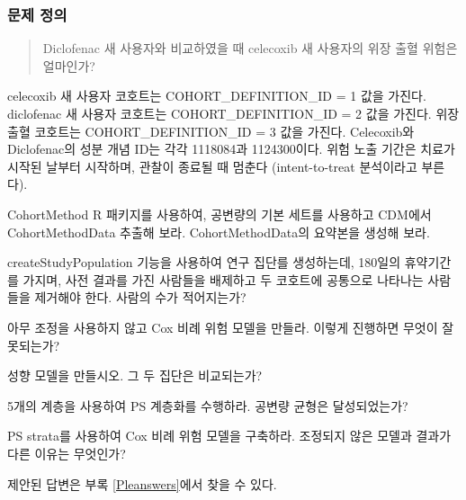\documentclass[11pt]{book}
\theoremstyle{definition}
\theoremstyle{definition}
\theoremstyle{definition}
\theoremstyle{remark}
\let\BeginKnitrBlock\begin \let\EndKnitrBlock\end
\begin{document}
\subsubsection*{문제 정의}\label{--2}

\begin{quote}
Diclofenac 새 사용자와 비교하였을 때 celecoxib 새 사용자의 위장 출혈
위험은 얼마인가?
\end{quote}

celecoxib 새 사용자 코호트는 COHORT\_DEFINITION\_ID = 1 값을 가진다.
diclofenac 새 사용자 코호트는 COHORT\_DEFINITION\_ID = 2 값을 가진다.
위장 출혈 코호트는 COHORT\_DEFINITION\_ID = 3 값을 가진다. Celecoxib와
Diclofenac의 성분 개념 ID는 각각 1118084과 1124300이다. 위험 노출 기간은
치료가 시작된 날부터 시작하며, 관찰이 종료될 때 멈춘다 (intent-to-treat
분석이라고 부른다).

\BeginKnitrBlock{exercise}
\protect\hypertarget{exr:exercisePle1}{}{\label{exr:exercisePle1}
}CohortMethod R 패키지를 사용하여, 공변량의 기본 세트를 사용하고 CDM에서
CohortMethodData 추출해 보라. CohortMethodData의 요약본을 생성해 보라.
\EndKnitrBlock{exercise}

\BeginKnitrBlock{exercise}
\protect\hypertarget{exr:exercisePle2}{}{\label{exr:exercisePle2}
}createStudyPopulation 기능을 사용하여 연구 집단를 생성하는데, 180일의
휴약기간를 가지며, 사전 결과를 가진 사람들을 배제하고 두 코호트에
공통으로 나타나는 사람들을 제거해야 한다. 사람의 수가 적어지는가?
\EndKnitrBlock{exercise}

\BeginKnitrBlock{exercise}
\protect\hypertarget{exr:exercisePle3}{}{\label{exr:exercisePle3} }아무
조정을 사용하지 않고 Cox 비례 위험 모델을 만들라. 이렇게 진행하면 무엇이
잘못되는가?
\EndKnitrBlock{exercise}

\BeginKnitrBlock{exercise}
\protect\hypertarget{exr:exercisePle4}{}{\label{exr:exercisePle4} }성향
모델을 만들시오. 그 두 집단은 비교되는가?
\EndKnitrBlock{exercise}

\BeginKnitrBlock{exercise}
\protect\hypertarget{exr:exercisePle5}{}{\label{exr:exercisePle5} }5개의
계층을 사용하여 PS 계층화를 수행하라. 공변량 균형은 달성되었는가?
\EndKnitrBlock{exercise}

\BeginKnitrBlock{exercise}
\protect\hypertarget{exr:exercisePle6}{}{\label{exr:exercisePle6} }PS
strata를 사용하여 Cox 비례 위험 모델을 구축하라. 조정되지 않은 모델과
결과가 다른 이유는 무엇인가?
\EndKnitrBlock{exercise}

제안된 답변은 부록 \ref{Pleanswers}에서 찾을 수 있다.
\end{document}
